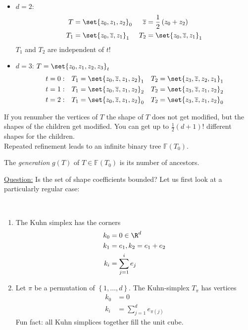 \begin{example}\
	\begin{itemize}
		\item $d=2$:
			\begin{align*}
      T &= \set{z_{0},z_{1},z_{2}}_{0} & \overline{z}&= \frac{1}{2}\left(z_{0} + z_{2} \right)\\
      T_{1} &= \set{ z_{0},\overline{z},z_{1}}_{1}  & T_{2} &= \set{z_{0},\overline{z},z_{1}}_{1}
			\end{align*}
			$T_1$ and $T_2$ are independent of $t$!
			
		\item $d= 3$: \quad $T = \set{ z_{0},z_{1},z_{2},z_{3} }_{t}$
      \begin{align*}
        t&=0: & T_{1}&= \set{ z_{0},\overline{z}, z_{1},z_{2}}_{1} & T_{2}&= \set{z_{3},\overline{z}, z_{2},z_{1}}_{1}\\
        t&=1: & T_{1}&= \set{z_{0},\overline{z}, z_{1},z_{2}}_{2} & T_{2}&= \set{z_{3},\overline{z}, z_{1},z_{2} }_{2}\\
        t&=2: & T_{1}&= \set{ z_{0},\overline{z}, z_{1},z_{2} }_{0} & T_{2}&= \set{ z_{3},\overline{z}, z_{1},z_{2} }_{0}
			\end{align*}
	\end{itemize}
\end{example}
If you renumber the vertices of $T$ the shape of $T$ does not get modified, but the shapes of the children get modified. You can get up to $\frac{1}{2}\left(d+1 \right)!$ different shapes for the children.\\
Repeated refinement leads to an infinite binary tree $\mathbb{F}(T_{0})$.
\begin{definition}
	The \textit{generation} $g(T)$ of $T \in \mathbb{F}(T_{0})$ is its number of ancestors.
\end{definition}
\underline{Question:} Is the set of shape coefficients bounded?\nl
Let us first look at a particularly regular case:
\begin{definition}\
	\begin{enumerate}[label = \Roman*)]
		\item The Kuhn simplex has the corners
			\begin{align*}
				k_{0}&=0 \in \R^d\\
				k_{1}&=e_{1}, k_{2}=e_1 + e_{2}\\
				k_{i}&= \sum_{j=1}^{i} e_{j}
			\end{align*}
			
		\item Let $\pi$ be a permutation of $\left\{1,\dots ,d \right\}$. The Kuhn-simplex $T_{\pi}$ has vertices
			\begin{align*}
				k_{0}&=0 \\
				k_{i}&= \sum_{j=1}^{d} e_{\pi(j)}
			\end{align*}		
      Fun fact: all Kuhn simplices together fill the unit cube.
	\end{enumerate}
\end{definition}
